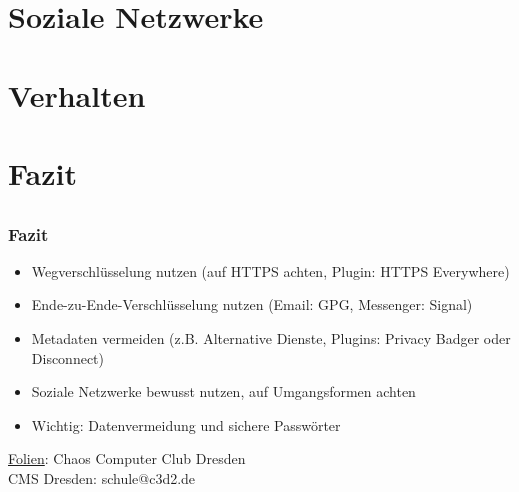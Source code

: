 
\section{Soziale Netzwerke}
\subsection{}


\section{Verhalten}
\subsection{}


\section{Fazit}
\subsection{}

\begin{frame}
  \frametitle{Fazit}
  \begin{center}
    \begin{itemize}
      \item Wegverschlüsselung nutzen (auf HTTPS achten, Plugin: HTTPS Everywhere)
      \item Ende-zu-Ende-Verschlüsselung nutzen (Email: GPG, Messenger: Signal)
      \item Metadaten vermeiden (z.B. Alternative Dienste, Plugins: Privacy Badger oder Disconnect)
      \item Soziale Netzwerke bewusst nutzen, auf Umgangsformen achten
      \item Wichtig: Datenvermeidung und sichere Passwörter
    \end{itemize}

    \vspace{5mm}
    \href{https://github.com/cms/2016_05_04_kleinzschachwitz/}{Folien}: \href{https://creativecommons.org/licenses/by-sa/4.0/}{} Chaos Computer Club Dresden \\
    \vspace{3mm}
    CMS Dresden: schule@c3d2.de
  \end{center}
\end{frame}
